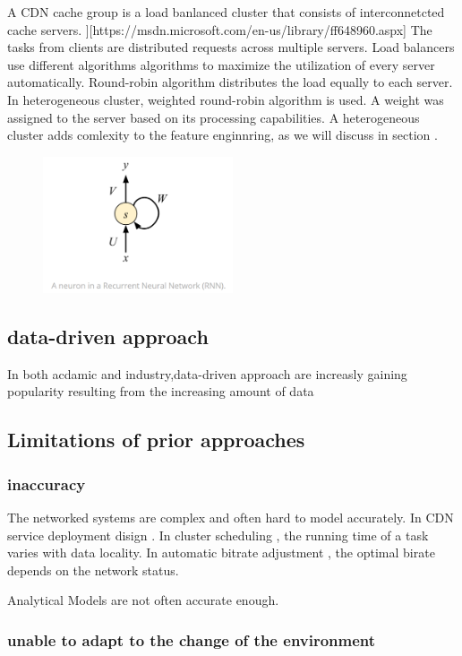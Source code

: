 \documentclass[review]{elsarticle}
\begin{document}
A CDN cache group is a load banlanced cluster that consists of interconnetcted cache servers. ][https://msdn.microsoft.com/en-us/library/ff648960.aspx] The tasks from clients are distributed requests across multiple servers. Load balancers use different algorithms algorithms to maximize the utilization of every server automatically. Round-robin algorithm distributes the load equally to each server. In heterogeneous cluster,  weighted round-robin algorithm is used. A weight was assigned to the server based on its processing capabilities. A heterogeneous cluster adds comlexity to the feature enginnring, as we will discuss in section {}.
\begin{figure}[h]
    \centering
    \includegraphics[width=0.5\textwidth]{RNN.png}
    \caption{}
    \label{fig:RNN}
\end{figure}
\subsection{data-driven approach}
In both acdamic and industry,data-driven approach are increasly gaining popularity resulting from the increasing amount of data 
\subsection{Limitations of prior approaches}
\subsubsection{inaccuracy}
  The networked systems are complex and often hard to model accurately. In CDN service deployment disign \cite{}. In cluster scheduling \cite{}, the running time of a task varies with data locality. In automatic bitrate adjustment \cite{Mao2017NeuralPensieve}, the optimal birate depends on the network status.

  Analytical Models are not often accurate enough.

\subsubsection{unable to adapt to the change of the environment}
\end{document}
